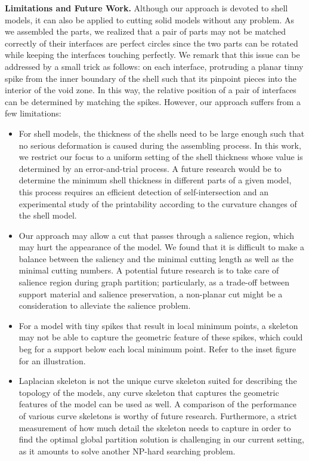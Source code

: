 \textbf{Limitations and Future Work.} Although our approach is devoted to shell models, it can also be applied to cutting solid models without any problem. As we assembled the parts, we realized that a pair of parts may not be matched correctly of their interfaces are perfect circles since the two parts can be rotated while keeping the interfaces touching perfectly. We remark that this issue can be addressed by a small trick as follows: on each interface, protruding a planar tinny spike from the inner boundary of the shell such that its pinpoint pieces into the interior of the void zone. In this way, the relative position of a pair of interfaces can be determined by matching the spikes. However, our approach suffers from a few limitations:

\begin{itemize}
 \item  For shell models, the thickness of the shells need to be large enough such that no serious deformation is caused during the assembling process. In this work, we restrict our focus to a uniform setting of the shell thickness whose value is determined by an error-and-trial process. A future research would be to determine the minimum shell thickness in different parts of a given model, this process requires an efficient detection of self-intersection and an experimental study of the printability according to the curvature changes of the shell model.
 \item  Our approach may allow a cut that passes through a salience region, which may hurt the appearance of the model. We found that it is difficult to make a balance between the saliency and the minimal cutting length as well as the minimal cutting numbers. A potential future research is to take care of salience region during graph partition; particularly, as a trade-off between support material and salience preservation, a non-planar cut might be a consideration to alleviate the salience problem.
 \item  For a model with tiny spikes that result in local minimum points, a skeleton may not be able to capture the geometric feature of these spikes, which could beg for a support below each local minimum point. Refer to the inset figure for an illustration.
 \item  Laplacian skeleton is not the unique curve skeleton suited for describing the topology of the models, any curve skeleton that captures the geometric features of the model can be used as well. A comparison of the performance of various curve skeletons is worthy of future research. Furthermore, a strict measurement of how much detail the skeleton needs to capture in order to find the optimal global partition solution is challenging in our current setting, as it amounts to solve another NP-hard searching problem.

\end{itemize}
